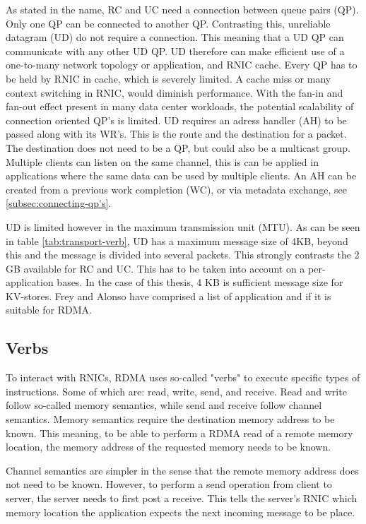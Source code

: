 As stated in the name, RC and UC need a connection between queue pairs (QP).
Only one QP can be connected to another QP.
Contrasting this, unreliable datagram (UD) do not require a connection.
This meaning that a UD QP can communicate with any other UD QP.
UD therefore can make efficient use of a one-to-many network topology or application, and RNIC cache.
Every QP has to be held by RNIC in cache, which is severely limited\cite{qiu2018toward}.
A cache miss or many context switching in RNIC, would diminish performance.
With the fan-in and fan-out effect present in many data center workloads\cite{vasudevan2009safe}, the potential scalability of connection oriented QP's is limited\cite{kalia2016fasst}.
UD requires an adress handler (AH) to be passed along with its WR's.
This is the route and the destination for a packet.
The destination does not need to be a QP, but could also be a multicast group.
Multiple clients can listen on the same channel, this is can be applied in applications where the same data can be used by multiple clients.
An AH can be created from a previous work completion (WC), or via metadata exchange, see \ref{subsec:connecting-qp's}.

UD is limited however in the maximum transmission unit (MTU).
As can be seen in table \ref{tab:transport-verb}, UD has a maximum message size of 4KB, beyond this and the message is divided into several packets.
This strongly contrasts the 2 GB available for RC and UC.
This has to be taken into account on a per-application bases.
In the case of this thesis, 4 KB is sufficient message size for KV-stores.
Frey and Alonso have comprised a list of application and if it is suitable for RDMA\cite{frey2009minimizing}.

\subsection{Verbs}\label{subsec:verbs}
To interact with RNICs, RDMA uses so-called "verbs" to execute specific types of instructions.
Some of which are: read, write, send, and receive.
Read and write follow so-called memory semantics, while send and receive follow channel semantics.
Memory semantics require the destination memory address to be known.
This meaning, to be able to perform a RDMA read of a remote memory location, the memory address of the requested memory needs to be known.

Channel semantics are simpler in the sense that the remote memory address does not need to be known.
However, to perform a send operation from client to server, the server needs to first post a receive.
This tells the server's RNIC which memory location the application expects the next incoming message to be place.

